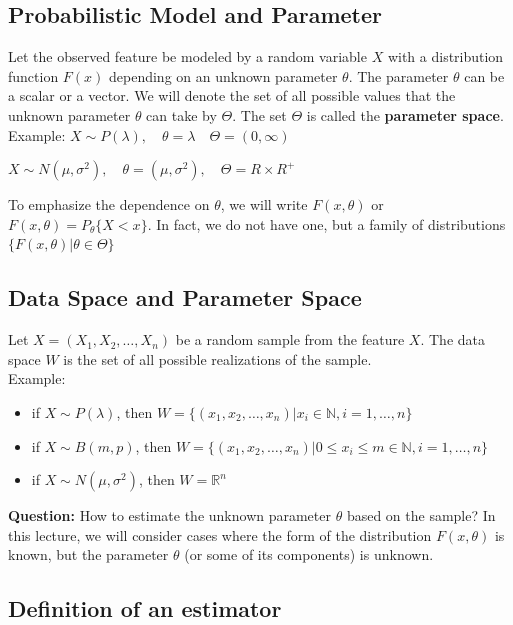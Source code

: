 \documentclass[a4paper, 12pt]{article}
\begin{document}
\subsection{Probabilistic Model and Parameter}

Let the observed feature be modeled by a random variable $X$ with a distribution function $F(x)$ depending on an unknown parameter $\theta$. The parameter $\theta$ can be a scalar or a vector. We will denote the set of all possible values that the unknown parameter $\theta$ can take by $\Theta$. The set $\Theta$ is called the \textbf{parameter space}.\\

Example: $X \sim P(\lambda),\quad \theta=\lambda \quad \Theta=(0,\infty)$

$X\sim N(\mu, \sigma^2), \quad \theta=(\mu, \sigma^2), \quad \Theta=R \times R^+$

To emphasize the dependence on $\theta$, we will write $F(x,\theta)$ or $F(x,\theta)=P_\theta\{ X < x \}$. In fact, we do not have one, but a family of distributions $\{F(x, \theta) | \theta \in \Theta \}$


\subsection{Data Space and Parameter Space}

Let $X=(X_1, X_2, \dots , X_n)$ be a random sample from the feature $X$. The data space $W$ is the set of all possible realizations of the sample.\\

Example:

\begin{itemize}
  \item if $X\sim P(\lambda)$, then $W = \{ (x_1,x_2, \dots, x_n) | x_i \in \mathbb{N}, i=1,\dots,n \}$
  \item if $X\sim B(m,p)$, then $W = \{ (x_1,x_2, \dots, x_n) | 0 \leq x_i \leq m \in \mathbb{N}, i=1,\dots,n \}$
  \item if $X\sim N(\mu, \sigma^2)$, then $W = \mathbb{R}^n$
\end{itemize}

\textbf{Question:} How to estimate the unknown parameter $\theta$ based on the sample?
In this lecture, we will consider cases where the form of the distribution $F(x, \theta)$ is known, but the parameter $\theta$ (or some of its components) is unknown.

\subsection{Definition of an estimator}
\end{document}
